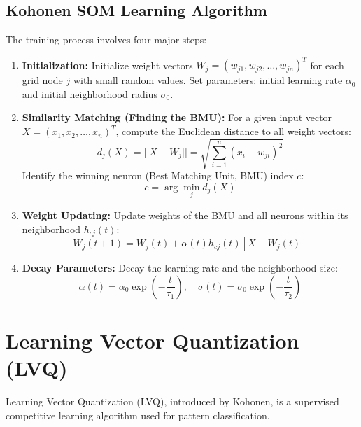 \documentclass[12pt,a4paper]{article}
\begin{document}
\subsection{Kohonen SOM Learning Algorithm}
The training process involves four major steps:
\begin{enumerate}[leftmargin=*, itemsep=3.5pt]
  \item \textbf{Initialization:} Initialize weight vectors $W_j = (w_{j1}, w_{j2}, \ldots, w_{jn})^T$ for each grid node $j$ with small random values. Set parameters: initial learning rate $\alpha_0$ and initial neighborhood radius $\sigma_0$.
  \item \textbf{Similarity Matching (Finding the BMU):} For a given input vector $X = (x_1, x_2, \ldots, x_n)^T$, compute the Euclidean distance to all weight vectors:
    \begin{equation}
      d_j(X) = ||X - W_j|| = \sqrt{\sum_{i=1}^n (x_i - w_{ji})^2}
    \end{equation}
    Identify the winning neuron (Best Matching Unit, BMU) index $c$:
    \begin{equation}
      c = \arg\min_{j} d_j(X)
    \end{equation}
  \item \textbf{Weight Updating:} Update weights of the BMU and all neurons within its neighborhood $h_{cj}(t)$:
    \begin{equation}
      W_j(t+1) = W_j(t) + \alpha(t) h_{cj}(t) [X - W_j(t)]
    \end{equation}
  \item \textbf{Decay Parameters:} Decay the learning rate and the neighborhood size:
    \begin{equation}
      \alpha(t) = \alpha_0 \exp\left(-\frac{t}{\tau_1}\right), \quad \sigma(t) = \sigma_0 \exp\left(-\frac{t}{\tau_2}\right)
    \end{equation}
\end{enumerate}

\section{Learning Vector Quantization (LVQ)}

Learning Vector Quantization (LVQ), introduced by Kohonen, is a supervised competitive learning algorithm used for pattern classification.
\end{document}

